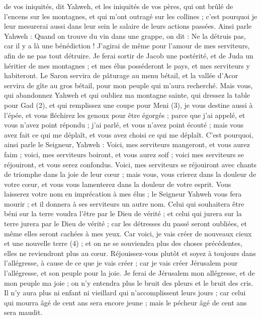 \begin{multicols}{2}
{de vos iniquités, dit Yahweh, et les iniquités de vos pères, qui ont brûlé de l’encens sur les montagnes, et qui m’ont outragé sur les collines ; c'est pourquoi je leur mesurerai aussi dans leur sein le salaire de leurs actions passées.
Ainsi parle Yahweh : Quand on trouve du vin dans une grappe, on dit : Ne la détruis pas, car il y a là une bénédiction ! J’agirai de même pour l’amour de mes serviteurs, afin de ne pas tout détruire.
Je ferai sortir de Jacob une postérité, et de Juda un héritier de mes montagnes ; et mes élus posséderont le pays, et mes serviteurs y habiteront.
Le Saron servira de pâturage au menu bétail, et la vallée d’Acor servira de gîte au gros bétail, pour mon peuple qui m'aura recherché.
Mais vous, qui abandonnez Yahweh et qui oubliez ma montagne sainte, qui dressez la table pour Gad (2), et qui remplissez une coupe pour Meni (3),
je vous destine aussi à l'épée, et vous fléchirez les genoux pour être égorgés ; parce que j'ai appelé, et vous n'avez point répondu ; j'ai parlé, et vous n'avez point écouté ; mais vous avez fait ce qui me déplaît, et vous avez choisi ce qui me déplaît.
C'est pourquoi, ainsi parle le Seigneur, Yahweh : Voici, mes serviteurs mangeront, et vous aurez faim ; voici, mes serviteurs boiront, et vous aurez soif ; voici mes serviteurs se réjouiront, et vous serez confondus.
Voici, mes serviteurs se réjouiront avec chants de triomphe dans la joie de leur cœur ; mais vous, vous crierez dans la douleur de votre cœur, et vous vous lamenterez dans la douleur de votre esprit.
Vous laisserez votre nom en imprécation à mes élus ; le Seigneur Yahweh vous fera mourir ; et il donnera à ses serviteurs un autre nom.
Celui qui souhaitera être béni sur la terre voudra l’être par le Dieu de vérité ; et celui qui jurera sur la terre jurera par le Dieu de vérité ; car les détresses du passé seront oubliées, et même elles seront cachées à mes yeux.
Car voici, je vais créer de nouveaux cieux et une nouvelle terre (4) ; et on ne se souviendra plus des choses précédentes, elles ne reviendront plus au cœur.
Réjouissez-vous plutôt et soyez à toujours dans l’allégresse, à cause de ce que je vais créer ; car je vais créer Jérusalem pour l’allégresse, et son peuple pour la joie.
Je ferai de Jérusalem mon allégresse, et de mon peuple ma joie ; on n'y entendra plus le bruit des pleurs et le bruit des cris.
Il n'y aura plus ni enfant ni vieillard qui n’accomplissent leurs jours ; car celui qui mourra âgé de cent ans sera encore jeune ; mais le pécheur âgé de cent ans sera maudit.
}
\end{multicols}
